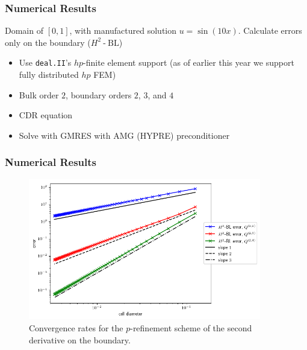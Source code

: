\documentclass[8pt]{beamer}
\DeclareMathOperator{\hyphen}{-}
\begin{document}
\begin{frame}
    \frametitle{Numerical Results}
    Domain of \([0, 1]\), with manufactured solution \(u = \sin(10 x)\).
    Calculate errors only on the boundary (\(H^2{\hyphen}\text{BL}\))
    \begin{itemize}
        \item Use \texttt{deal.II}'s \(hp\)-finite element support (as of
              earlier this year we support fully distributed \(hp\) FEM)
        \item Bulk order \(2\), boundary orders \(2\), \(3\), and \(4\)
        \item CDR equation
        \item Solve with GMRES with AMG (HYPRE) preconditioner
    \end{itemize}
\end{frame}

\begin{frame}
    \frametitle{Numerical Results}
    \begin{figure}
        \centering
        \includegraphics[width=4in]{Pictures/oned-cdr-2-h2-errors.png}

        \caption{Convergence rates for the \(p\)-refinement scheme of the second
        derivative on the boundary.}
    \end{figure}
\end{frame}
\end{document}
